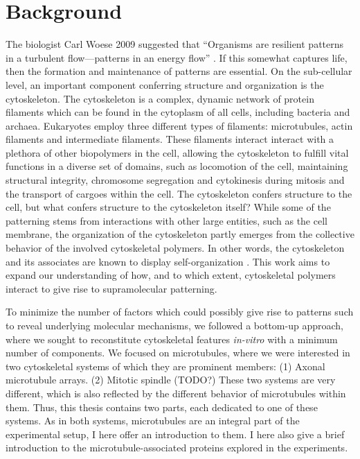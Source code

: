 \chapter{Background}
The biologist Carl Woese 2009 suggested that “Organisms are resilient patterns in a turbulent flow—patterns in an energy flow” \cite{Woese}. If this somewhat captures life, then the formation and maintenance of patterns are essential. On the sub-cellular level, an important component conferring structure and organization is the cytoskeleton. The cytoskeleton is a complex, dynamic network of protein filaments which can be found in the cytoplasm of all cells, including bacteria and archaea. Eukaryotes employ three different types of filaments: microtubules, actin filaments and intermediate filaments. These filaments interact interact with a plethora of other biopolymers in the cell, allowing the cytoskeleton to fulfill vital functions in a diverse set of domains, such as locomotion of the cell, maintaining structural integrity, chromosome segregation and cytokinesis during mitosis and the transport of cargoes within the cell. The cytoskeleton confers structure to the cell, but what confers structure to the cytoskeleton itself? While some of the patterning stems from interactions with other large entities, such as the cell membrane, the organization of the cytoskeleton partly emerges from the collective behavior of the involved cytoskeletal polymers. In other words, the cytoskeleton and its associates are known to display self-organization \parencite{Karsenti2008}. This work aims to expand our understanding of how, and to which extent, cytoskeletal polymers interact to give rise to supramolecular patterning. \par
To minimize the number of factors which could possibly give rise to patterns such to reveal underlying molecular mechanisms, we followed a bottom-up approach, where we sought to reconstitute cytoskeletal features \textit{in-vitro} with a minimum number of components. We focused on microtubules, where we were interested in two cytoskeletal systems of which they are prominent members: (1) Axonal microtubule arrays. (2) Mitotic spindle (TODO?) These two systems are very different, which is also reflected by the different behavior of microtubules within them. Thus, this thesis contains two parts, each dedicated to one of these systems. As in both systems, microtubules are an integral part of the experimental setup, I here offer an introduction to them. I here also give a brief introduction to the microtubule-associated proteins explored in the experiments.

